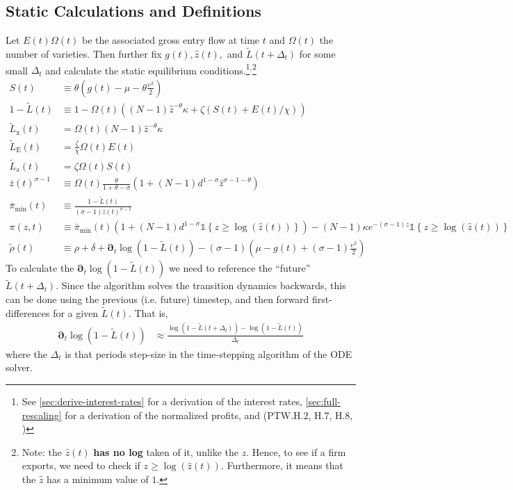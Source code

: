 \documentclass[11pt]{article}
\newcommand{\D}[1][]{\ensuremath{\boldsymbol{\partial}_{#1}}}
\newcommand{\indicator}[1]{\ensuremath{\mathds{1}\left\{{#1}\right\}}}
\begin{document}
\subsection{Static Calculations and Definitions}
Let $E(t)\Omega(t)$ be the associated gross entry flow at time $t$ and $\Omega(t)$ the number of varieties.  Then further fix $g(t), \hat{z}(t),$ and  $\tilde{L}(t+\Delta_t)$ for some small $\Delta_t$ and calculate the static equilibrium conditions.\footnote{See \cref{sec:derive-interest-rates} for a derivation of the interest rates, \cref{sec:full-rescaling} for a derivation of the normalized profits, and (PTW.H.2, H.7, H.8, )}${}^{,}$\footnote{Note: the $\hat{z}(t)$ \textbf{has no log} taken of it, unlike the $z$.  Hence, to see if a firm exports, we need to check if $z \geq \log(\hat{z}(t))$.  Furthermore, it means that the $\hat{z}$ has a minimum value of $1$.}
\begin{align}
	S(t) &\equiv \theta \left( g(t) - \mu - \theta\frac{\upsilon^2}{2}\right)\\
	1 - \tilde{L}(t) &\equiv 1 - \Omega(t)\left((N -1)\hat{z}^{-\theta}\kappa + \zeta \left(S(t) + E(t)/\chi \right)\right)\\
	\tilde{L}_{\text{x}}(t) &= \Omega(t) (N -1)\hat{z}^{-\theta}\kappa\\
	\tilde{L}_{\text{E}}(t) &= \frac{\zeta}{\chi}\Omega(t) E(t)\\
	\tilde{L}_{\text{a}}(t) &= \zeta \Omega(t) S(t)\\
	\bar{z}(t)^{\sigma - 1}&\equiv \Omega(t)
\frac{\theta}{1+\theta - \sigma}\left(1 + (N-1)d^{1-\sigma}\hat{z}^{\sigma - 1 -\theta} \right)\\
	\bar{\pi}_{\min}(t) &\equiv \frac{1-\tilde{L}(t)}{(\sigma-1)\bar{z}(t)^{\sigma-1}}\\
	\pi(z,t) &\equiv \bar{\pi}_{\min}(t)\left(1 + (N-1)d^{1-\sigma}\indicator{z \geq \log(\hat{z}(t))}\right) - (N-1)\kappa e^{-(\sigma - 1)z}\indicator{z \geq \log(\hat{z}(t))}\\
	\tilde{\rho}(t) &\equiv \rho+ \delta + \D[t]\log\left(1 - \tilde{L}(t)\right) - (\sigma - 1)\left(\mu - g(t) + (\sigma - 1)\frac{\upsilon^2}{2} \right)
\end{align}
To calculate the $\D[t]\log\left(1 - \tilde{L}(t)\right)$ we need to reference the ``future'' $\tilde{L}(t+\Delta_t)$.  Since the algorithm solves the transition dynamics backwards, this can be done using the previous (i.e. future) timestep, and then forward first-differences for a given $\tilde{L}(t)$.  That is,
\begin{align}
	\D[t]\log\left(1 - \tilde{L}(t)\right) &\approx \frac{\log\left(1 - \tilde{L}(t+\Delta_t)\right) - \log\left(1 - \tilde{L}(t)\right)}{\Delta_t}
\end{align}
where the $\Delta_t$ is that periods step-size in the time-stepping algorithm of the ODE solver.
\end{document}
